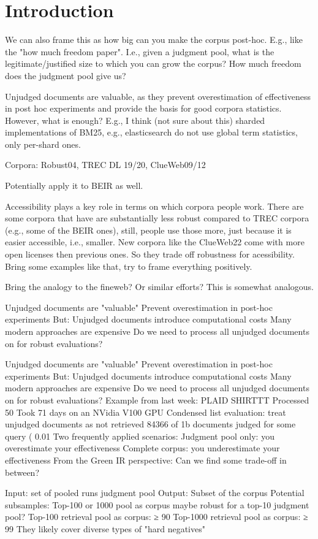 \section{Introduction}

We can also frame this as how big can you make the corpus post-hoc. E.g., like the "how much freedom paper". I.e., given a judgment pool, what is the legitimate/justified size to which you can grow the corpus? How much freedom does the judgment pool give us?

Unjudged documents are valuable, as they prevent overestimation of effectiveness in post hoc experiments and provide the basis for good corpora statistics. However, what is enough? E.g., I think (not sure about this) sharded implementations of BM25, e.g., elasticsearch do not use global term statistics, only per-shard ones.

Corpora: Robust04, TREC DL 19/20, ClueWeb09/12

Potentially apply it to BEIR as well.


Accessibility plays a key role in terms on which corpora people work. There are some corpora that have are substantially less robust compared to TREC corpora (e.g., some of the BEIR ones), still, people use those more, just because it is easier accessible, i.e., smaller. New corpora like the ClueWeb22 come with more open licenses then previous ones. So they trade off robustness for acessibility. Bring some examples like that, try to frame everything positively.

Bring the analogy to the fineweb? Or similar efforts? This is somewhat analogous.


Unjudged documents are "valuable"
Prevent overestimation in post-hoc experiments
But: Unjudged documents introduce computational costs
Many modern approaches are expensive
Do we need to process all unjudged documents on for robust evaluations?




Unjudged documents are "valuable"
Prevent overestimation in post-hoc experiments
But: Unjudged documents introduce computational costs
Many modern approaches are expensive
Do we need to process all unjudged documents on for robust evaluations?
Example from last week: PLAID SHIRTTT
Processed 50%
Took 71 days on an NVidia V100 GPU
Condensed list evaluation: treat unjudged documents as not retrieved
84366 of 1b documents judged for some query ( 0.01%
Two frequently applied scenarios:
Judgment pool only: you overestimate your effectiveness
Complete corpus: you underestimate your effectiveness
From the Green IR perspective: Can we find some trade-off in between?


Input:
set of pooled runs
judgment pool
Output:
Subset of the corpus
Potential subsamples:
Top-100 or 1000 pool as corpus maybe robust for a top-10 judgment pool?
Top-100 retrieval pool as corpus: ≥ 90%
Top-1000 retrieval pool as corpus: ≥ 99%
They likely cover diverse types of "hard negatives"
